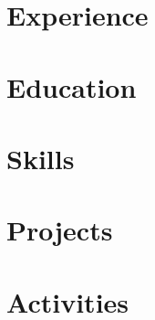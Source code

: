 \documentclass{article}
\begin{document}
\setlength{\footskip}{3.60004pt}



\section{Experience}


\section{Education}


\section{Skills}


\section{Projects}


\section{Activities}

\end{document}
